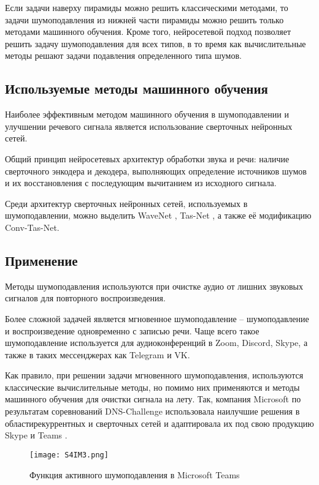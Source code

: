 Если задачи наверху пирамиды можно решить классическими методами,
то задачи шумоподавления из нижней части пирамиды можно решить
только методами машинного обучения. Кроме того, нейросетевой
подход позволяет решить задачу шумоподавления для всех типов,
в то время как вычислительные методы решают задачи подавления
определенного типа шумов.

\subsection{Используемые методы машинного обучения}

Наиболее эффективным методом машинного обучения в шумоподавлении
и улучшении речевого сигнала является
использование сверточных нейронных сетей.

Общий принцип нейросетевых архитектур обработки звука и речи:
наличие сверточного энкодера и декодера, выполняющих определение
источников шумов и их восстановления с последующим вычитанием
из исходного сигнала.

Среди архитектур сверточных нейронных сетей, 
используемых в шумоподавлении, можно выделить
WaveNet \cite{wavenet}, Tas-Net \cite{tasnet}, а также её модификацию Conv-Tas-Net. 

\subsection{Применение}

Методы шумоподавления используются при очистке аудио от лишних
звуковых сигналов для повторного воспроизведения.

Более сложной задачей является мгновенное шумоподавление -- 
шумоподавление и воспроизведение одновременно с записью речи.
Чаще всего такое шумоподавление используется для аудиоконференций в
Zoom, Discord, Skype, а также в таких мессенджерах как Telegram и VK. 

Как правило, при решении задачи мгновенного шумоподавления,
используются классические вычислительные методы, но помимо них
применяются и методы машинного обучения для очистки сигнала на лету.
Так, компания Microsoft по результатам соревнований DNS-Challenge
использовала наилучшие решения в областирекуррентных и сверточных сетей 
и адаптировала их под свою продукцию Skype и Teams \cite{skype}.

\begin{figure}[h!]
    \centering
    \texttt{[image: S4IM3.png]}
    \caption{Функция активного шумоподавления в Microsoft Teams}
\end{figure}